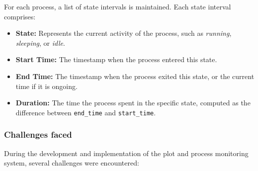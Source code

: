 \documentclass[12pt]{article}
\begin{document}
For each process, a list of state intervals is maintained. Each state interval comprises:
\begin{itemize}
    \item \textbf{State:} Represents the current activity of the process, such as \textit{running}, \textit{sleeping}, or \textit{idle}.
    \item \textbf{Start Time:} The timestamp when the process entered this state.
    \item \textbf{End Time:} The timestamp when the process exited this state, or the current time if it is ongoing.
    \item \textbf{Duration:} The time the process spent in the specific state, computed as the difference between \texttt{end\_time} and \texttt{start\_time}.
\end{itemize}


\subsubsection{Challenges faced}

During the development and implementation of the plot and process monitoring system, several challenges were encountered:
\end{document}
